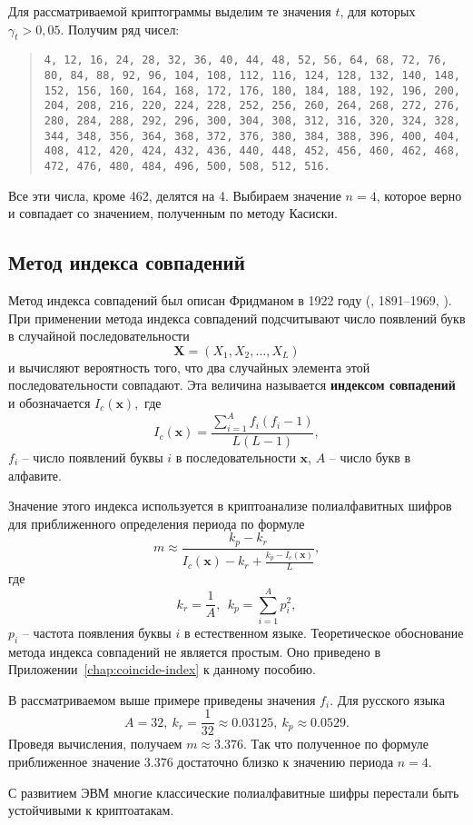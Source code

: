 \example
Для рассматриваемой криптограммы выделим те значения $t$, для которых $\gamma _t  > 0,05.$ Получим ряд чисел:

\begin{quote}
    \noindent \texttt{4, 12, 16, 24, 28, 32, 36, 40, 44, 48, 52, 56, 64, 68, 72, 76, 80, 84, 88, 92, 96, 104, 108, 112, 116, 124, 128, 132, 140, 148, 152, 156, 160, 164, 168, 172, 176, 180, 184, 188, 192, 196, 200, 204, 208, 216, 220, 224, 228, 252, 256, 260, 264, 268, 272, 276, 280, 284, 288, 292, 296, 300, 304, 308, 312, 316, 320, 324, 328, 344, 348, 356, 364, 368, 372, 376, 380, 384, 388, 396, 400, 404, 408, 412, 420, 424, 432, 436, 440, 448, 452, 456, 460, 462, 468, 472, 476, 480, 484, 496, 500, 508, 512, 516.}
\end{quote}

Все эти числа, кроме 462, делятся на 4. Выбираем значение $n=4$, которое верно и совпадает со значением, полученным по методу Касиски.
\exampleend


\subsection{Метод индекса совпадений}

Метод индекса совпадений был описан Фридманом в 1922 году (, 1891--1969, \cite{Friedman:1922}). При применении метода индекса совпадений подсчитывают число появлений букв в случайной последовательности
    \[ \mathbf{X} = (X_1 ,X_2 ,  \ldots , X_L ) \]
и вычисляют вероятность того, что два случайных элемента этой последовательности совпадают. Эта величина называется \textbf{индексом совпадений} и обозначается $I_{c}(\mathbf{x}),$ где
    \[ I_{c} (\mathbf{x}) = \frac{{\sum\limits_{i = 1}^A {f_i (f_i  - 1)} }} {{L(L - 1)}}, \]
$f_{i}$ -- число появлений буквы $i$  в последовательности $\mathbf{x}$, $A$ -- число букв в алфавите.

Значение этого индекса используется в криптоанализе полиалфавитных шифров для приближенного определения периода по формуле
    \[ m \approx \frac{{k_p  - k_r }} {{I_{c} (\mathbf{x}) - k_r  + \frac{{k_p  - I_{c} (\mathbf{x})}} {L}}}, \]
где
    \[ k_r  = \frac{1}{A}, ~~ k_p  = \sum\limits_{i=1}^A p_i^2, \]
$p_i $ -- частота появления буквы $i$ в естественном языке.
Теоретическое обоснование метода индекса совпадений не является простым. Оно приведено в Приложении~\ref{chap:coincide-index} к данному пособию.

\example
В рассматриваемом выше примере приведены значения $f_{i}$. Для русского языка
    \[ A=32, ~ k_{r} = \frac{1}{32} \approx 0.03125, ~ k_{p} \approx 0.0529. \]
Проведя вычисления, получаем $m \approx 3.376$. Так что полученное по формуле приближенное значение $3.376$ достаточно близко к значению периода $n=4$.
\exampleend

С развитием ЭВМ многие классические полиалфавитные шифры перестали быть устойчивыми к криптоатакам.
